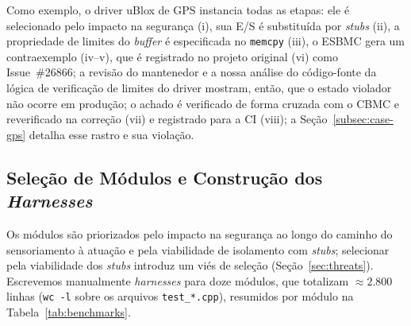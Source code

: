 \documentclass[conference]{IEEEtran}
\begin{document}
Como exemplo, o driver uBlox de GPS instancia todas as etapas: ele é
selecionado pelo impacto na segurança (i), sua E/S é substituída por
\textit{stubs} (ii), a propriedade de limites do \textit{buffer} é
especificada no \texttt{memcpy} (iii), o ESBMC gera um contraexemplo
(iv--v), que é registrado no projeto original (vi) como
Issue~\#26866; a revisão do mantenedor e a nossa análise do
código-fonte da lógica de verificação de limites do driver mostram,
então, que o estado violador não ocorre em produção; o achado é
verificado de forma cruzada com o CBMC e reverificado na correção
(vii) e registrado para a CI (viii); a Seção~\ref{subsec:case-gps}
detalha esse rastro e sua violação.

\subsection{Seleção de Módulos e Construção dos \textit{Harnesses}}
\label{subsec:harnesses}
Os módulos são priorizados pelo impacto na segurança ao longo do
caminho do sensoriamento à atuação e pela viabilidade de isolamento
com \textit{stubs}; selecionar pela viabilidade dos \textit{stubs}
introduz um viés de seleção (Seção~\ref{sec:threats}).
Escrevemos manualmente \textit{harnesses} para doze módulos, que
totalizam ${\approx}2.800$ linhas (\texttt{wc\,-l} sobre os arquivos
\texttt{test\_*.cpp}), resumidos por módulo na
Tabela~\ref{tab:benchmarks}.
\end{document}
